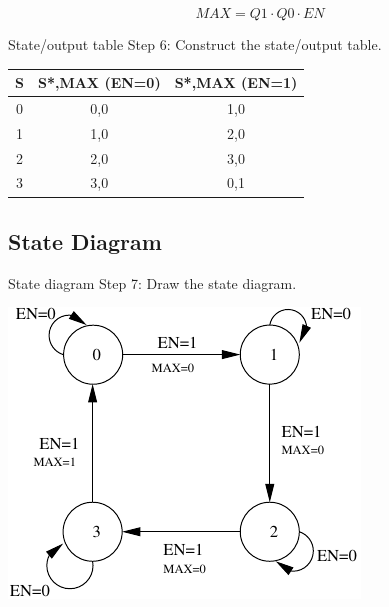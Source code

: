 $$MAX = Q1 \cdot Q0 \cdot EN$$

\begin{frame}[t]{State/output table}
  Step 6: Construct the state/output table.
\end{frame}

\begin{tabular}{c|cc}
  S & S*,MAX (EN=0) & S*,MAX (EN=1) \\
  \hline
  0 & 0,0 & 1,0 \\
  1 & 1,0 & 2,0 \\
  2 & 2,0 & 3,0 \\
  3 & 3,0 & 0,1 \\
\end{tabular}

\subsection{State Diagram}

\begin{frame}[t]{State diagram}
  Step 7: Draw the state diagram.
\end{frame}
\includegraphics{BinaryCounterStateDiagram}

